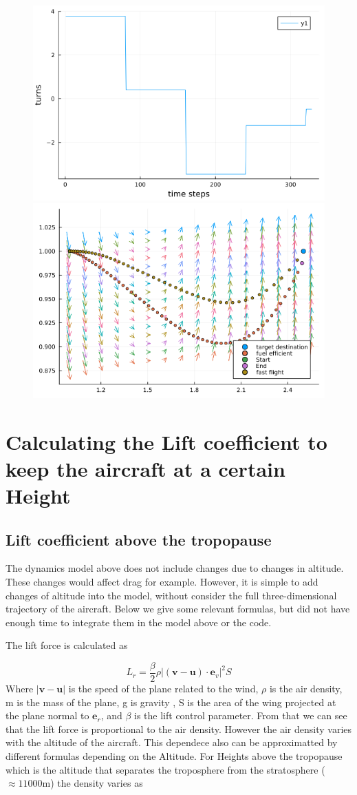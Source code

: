 \documentclass{article}
\renewcommand{\vec}[1]{\boldsymbol{#1}}
\begin{document}
\begin{figure}
    \centering
    \includegraphics[width = 0.49\linewidth]{../imgs/readme-4.png}
    \includegraphics[width = 0.49\linewidth]{../imgs/readme-5.png}
\end{figure}
\section{Calculating the Lift coefficient to keep the aircraft at a certain Height}

\subsection{Lift coefficient above the tropopause}

The dynamics model above does not include changes due to changes in altitude. These changes would affect drag for example. However, it is simple to add changes of altitude into the model, without consider the full three-dimensional trajectory of the aircraft. Below we give some relevant formulas, but did not have enough time to integrate them in the model above or the code.  

The lift force is calculated as  \cite{nuic2004bada} 

\begin{equation}
    L_r= \frac{\beta }{2} \rho |(\vec{v}-\vec{u})\cdot \vec e_v|^2S
\end{equation}
Where $|\vec{v}-\vec{u}|$ is the speed of the plane related to the wind, $\rho$ is the air density, m is the mass of the plane, g is gravity , S is the area of the wing  projected at the plane normal to $\vec{e}_r$, and $\beta$ is the lift control parameter. From that we can see that the lift force is proportional to the air density. However the air density varies with the altitude of the aircraft. This dependece also can be approximatted by different formulas depending on the Altitude. For Heights above the tropopause  \cite{nuic2004bada} which is the altitude that separates the troposphere from the stratosphere ($\approx 11000$m) the density varies as
\end{document}
